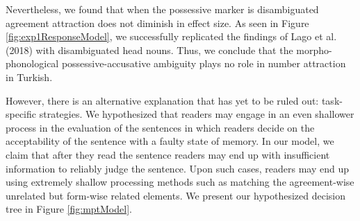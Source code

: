 \documentclass[
  english,
  doc,floatsintext]{apa6}
\begin{document}
Nevertheless, we found that when the possessive marker is disambiguated agreement attraction does not diminish in effect size. As seen in Figure \ref{fig:exp1ResponseModel}, we successfully replicated the findings of Lago et al. (2018) with disambiguated head nouns. Thus, we conclude that the morpho-phonological possessive-accusative ambiguity plays no role in number attraction in Turkish.

However, there is an alternative explanation that has yet to be ruled out: task-specific strategies. We hypothesized that readers may engage in an even shallower process in the evaluation of the sentences in which readers decide on the acceptability of the sentence with a faulty state of memory. In our model, we claim that after they read the sentence readers may end up with insufficient information to reliably judge the sentence. Upon such cases, readers may end up using extremely shallow processing methods such as matching the agreement-wise unrelated but form-wise related elements.
We present our hypothesized decision tree in Figure \ref{fig:mptModel}.
\end{document}
